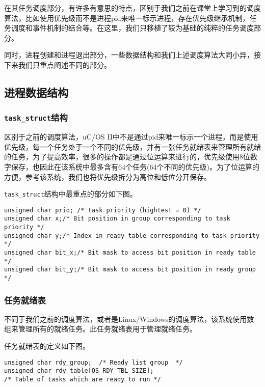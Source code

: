 在其任务调度部分，有许多有意思的特点，区别于我们之前在课堂上学习到的调度算法，比如使用优先级而不是进程pid来唯一标示进程，存在优先级继承机制，任务调度和事件机制的结合等。在这里，我们只移植了较为基础的纯粹的任务调度部分。

同时，进程创建和进程退出部分，一些数据结构和我们上述调度算法大同小异，接下来我们只重点阐述不同的部分。


\subsection{进程数据结构}

\subsubsection{\texttt{task\_struct}结构}

区别于之前的调度算法，uC/OS II中不是通过pid来唯一标示一个进程，而是使用优先级，每一个任务处于一个不同的优先级，并有一张任务就绪表来管理所有就绪的任务，为了提高效率，很多的操作都是通过位运算来进行的，优先级使用8位数字保存，也因此在该系统中最多含有64个任务(64个不同的优先级)。为了位运算的方便，参考该系统，我们也将优先级拆分为高位和低位分开保存。

\texttt{task\_struct}结构中最重点的部分如下图。

\begin{lstlisting}[caption=\texttt{task\_struct}数据结构]
unsigned char prio; /* task priority (hightest = 0) */
unsigned char x;/* Bit position in group corresponding to task priority */
unsigned char y;/* Index in ready table corresponding to task priority */
unsigned char bit_x;/* Bit mask to access bit position in ready table */        
unsigned char bit_y;/* Bit mask to access bit position in ready group */                       
\end{lstlisting}


\subsubsection{任务就绪表}

不同于我们之前的调度算法，或者是Linux/Windows的调度算法，该系统使用数组来管理所有的就绪任务。此任务就绪表用于管理就绪任务。

任务就绪表的定义如下图。

\begin{lstlisting}[caption=任务就绪表定义]
unsigned char rdy_group;  /* Ready list group  */
unsigned char rdy_table[OS_RDY_TBL_SIZE];
/* Table of tasks which are ready to run */
\end{lstlisting}


